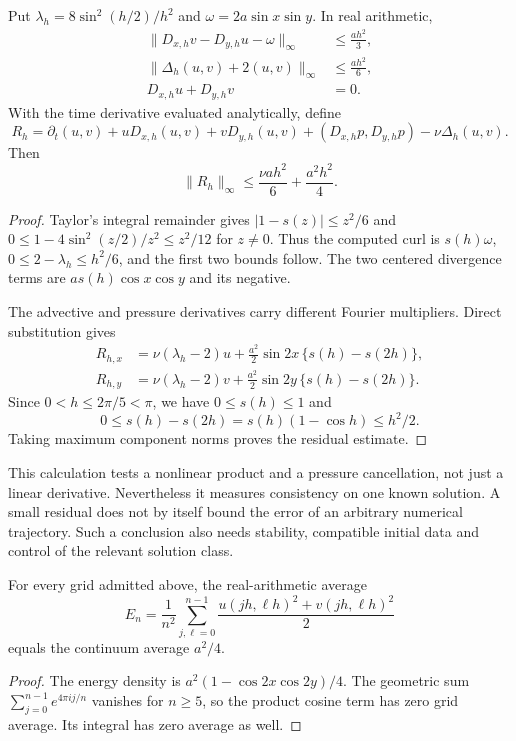 \begin{proposition}
\label{prop:fr-taylor-green}
Put $\lambda_h=8\sin^2(h/2)/h^2$ and
$\omega=2a\sin x\sin y$. In real arithmetic,
\begin{align*}
 \|D_{x,h}v-D_{y,h}u-\omega\|_\infty
     &\le \frac{ah^2}{3},\\
 \|\Delta_h(u,v)+2(u,v)\|_\infty
     &\le \frac{ah^2}{6},\\
 D_{x,h}u+D_{y,h}v&=0.
\end{align*}
With the time derivative evaluated analytically, define
\[
 R_h=\partial_t(u,v)
   +uD_{x,h}(u,v)+vD_{y,h}(u,v)
   +(D_{x,h}p,D_{y,h}p)-\nu\Delta_h(u,v).
\]
Then
\[
 \|R_h\|_\infty\le \frac{\nu ah^2}{6}+\frac{a^2h^2}{4}.
\]
\end{proposition}
\begin{proof}
Taylor's integral remainder gives
$|1-s(z)|\le z^2/6$ and
$0\le1-4\sin^2(z/2)/z^2\le z^2/12$ for $z\ne0$.
Thus the computed curl is $s(h)\omega$,
$0\le2-\lambda_h\le h^2/6$, and the first two bounds follow.
The two centered divergence terms are
$as(h)\cos x\cos y$ and its negative.

The advective and pressure derivatives carry different Fourier
multipliers. Direct substitution gives
\[
 \begin{split}
 R_{h,x}&=\nu(\lambda_h-2)u+
       \frac{a^2}{2}\sin2x\,\{s(h)-s(2h)\},\\
 R_{h,y}&=\nu(\lambda_h-2)v+
       \frac{a^2}{2}\sin2y\,\{s(h)-s(2h)\}.
 \end{split}
\]
Since $0<h\le2\pi/5<\pi$, we have $0\le s(h)\le1$ and
\[
 0\le s(h)-s(2h)=s(h)(1-\cos h)\le h^2/2.
\]
Taking maximum component norms proves the residual estimate.
\end{proof}

This calculation tests a nonlinear product and a pressure cancellation,
not just a linear derivative. Nevertheless it measures consistency on
one known solution. A small residual does not by itself bound the error
of an arbitrary numerical trajectory. Such a conclusion also needs
stability, compatible initial data and control of the relevant solution
class.

\begin{proposition}
\label{prop:fr-energy-quadrature}
For every grid admitted above, the real-arithmetic average
\[
 E_n=\frac1{n^2}\sum_{j,\ell=0}^{n-1}
       \frac{u(jh,\ell h)^2+v(jh,\ell h)^2}{2}
\]
equals the continuum average $a^2/4$.
\end{proposition}
\begin{proof}
The energy density is
$a^2(1-\cos2x\cos2y)/4$. The geometric sum
$\sum_{j=0}^{n-1}e^{4\pi i j/n}$ vanishes for $n\ge5$,
so the product cosine term has zero grid average. Its integral has zero
average as well.
\end{proof}


